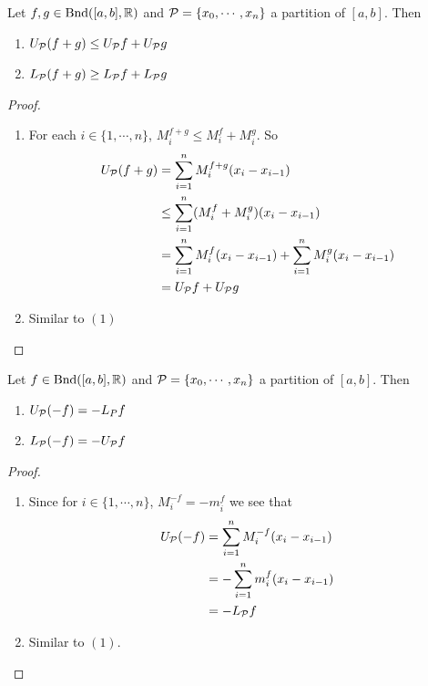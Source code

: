 \documentclass{book}
\begin{document}
	\begin{ex}  
		Let $f, g \in \text{Bnd}([a,b], \mathbb{R})$ and $\mathcal{P} = \{x_0, \cdots, x_n\}$ a partition of $[a,b]$. Then 
		\begin{enumerate}
			\item $U_{\mathcal{P}}(f+g) \leq U_{\mathcal{P}} f + U_{\mathcal{P}} g$
			\item $L_{\mathcal{P}}(f+g) \geq L_{\mathcal{P}} f + L_{\mathcal{P}} g$
		\end{enumerate}
	\end{ex}

	\begin{proof} \
		\begin{enumerate}
			\item For each $i \in \{1, \cdots, n\}$, $M^{f+g}_i \leq M^f_i + M^g_i$. So 
			\begin{align*}
				U_{\mathcal{P}} (f+g) 
				&= \sum\limits_{i=1}^n M^{f+g}_i (x_i - x_{i-1}) \\
				& \leq \sum\limits_{i=1}^n (M^f_i + M^g_i)(x_i - x_{i-1}) \\
				&= \sum\limits_{i=1}^n M^f_i(x_i - x_{i-1}) + \sum\limits_{i=1}^n M^g_i(x_i - x_{i-1}) \\
				&= U_{\mathcal{P}} f + U_{\mathcal{P}} g
			\end{align*}
			\item Similar to $(1)$
		\end{enumerate}
	\end{proof}

	\begin{ex}  
		Let $f \in \text{Bnd}([a,b], \mathbb{R})$ and $\mathcal{P} = \{x_0, \cdots, x_n\}$ a partition of $[a,b]$. Then 
		\begin{enumerate}
			\item $U_{\mathcal{P}} (-f) = -L_P f$
			\item $L_{\mathcal{P}} (-f) = - U_{\mathcal{P}} f$
		\end{enumerate}
	\end{ex}

	\begin{proof}\
		\begin{enumerate}
			\item Since for $i \in \{1, \cdots, n\}$, $M^{-f}_i = -m^f_i$ we see that 
			\begin{align*}
				U_{\mathcal{P}}(-f) 
				&= \sum\limits_{i=1}^n M^{-f}_i(x_i - x_{i-1}) \\
				&= - \sum\limits_{i=1}^n m^f_i(x_i - x_{i-1}) \\
				&= - L_{\mathcal{P}} f
			\end{align*}
			\item Similar to $(1)$.
		\end{enumerate}
	\end{proof}
\end{document}
